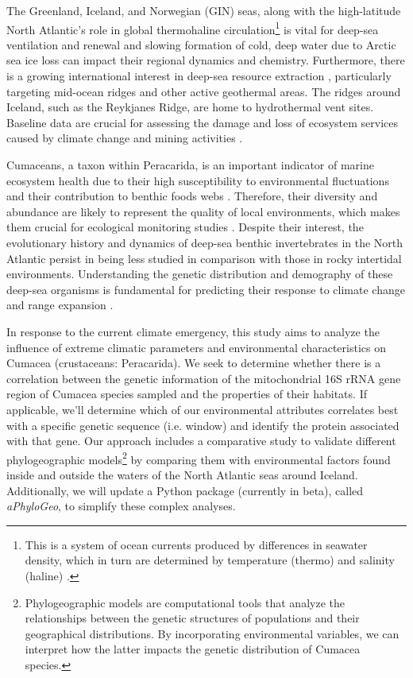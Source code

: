 The Greenland, Iceland, and Norwegian (GIN) seas, along with the high-latitude North Atlantic's role in global {thermohaline circulation}\footnote{This is a system of ocean currents produced by differences in seawater density, which in turn are determined by temperature (thermo) and salinity (haline) \citep{talley2013closure}.} is vital for deep-sea ventilation and renewal \citep{johannessen_relationship_1994, meisner_prefacebiodiversity_2018} and slowing formation of cold, deep water due to Arctic sea ice loss can impact their regional dynamics and chemistry. Furthermore, there is a growing international interest in deep-sea resource extraction \citep{mengerink_call_2014}, particularly targeting mid-ocean ridges and other active geothermal areas. The ridges around Iceland, such as the Reykjanes Ridge, are home to hydrothermal vent sites. Baseline data are crucial for assessing the damage and loss of ecosystem services caused by climate change and mining activities \citep{meisner_prefacebiodiversity_2018}. 

Cumaceans, a taxon within Peracarida, is an important indicator of marine ecosystem health due to their high susceptibility to environmental fluctuations \citep{stransky_diversity_2010} and their contribution to benthic foods webs \citep{rehm2009cumacea}. Therefore, their diversity and abundance are likely to represent the quality of local environments, which makes them crucial for ecological monitoring studies \citep{hessler1967faunal}. Despite their interest, the evolutionary history and dynamics of deep-sea benthic invertebrates in the North Atlantic persist in being less studied in comparison with those in rocky intertidal environments. Understanding the genetic distribution and demography of these deep-sea organisms is fundamental for predicting their response to climate change and range expansion \citep{jennings_phylogeographic_2014}.   

In response to the current climate emergency, this study aims to analyze the influence of extreme climatic parameters and environmental characteristics on Cumacea (crustaceans: Peracarida). We seek to determine whether there is a correlation between the genetic information of the mitochondrial 16S rRNA gene region of Cumacea species sampled and the properties of their habitats. If applicable, we'll determine which of our environmental attributes correlates best with a specific genetic sequence (i.e. window) and identify the protein associated with that gene. Our approach includes a comparative study to validate different {phylogeographic models}\footnote{Phylogeographic models are computational tools that analyze the relationships between the genetic structures of populations and their geographical distributions. By incorporating environmental variables, we can interpret how the latter impacts the genetic distribution of Cumacea species.} by comparing them with environmental factors found inside and outside the waters of the North Atlantic seas around Iceland. Additionally, we will update a Python package (currently in beta), called \textit{aPhyloGeo}, to simplify these complex analyses.

